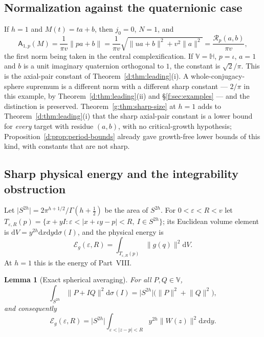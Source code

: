 \documentclass[11pt,a4paper]{article}
\numberwithin{equation}{section}
\newtheorem{lemma}[theorem]{Lemma}
\theoremstyle{definition}
\theoremstyle{remark}
\theoremstyle{plain}
\newcommand{\HH}{\mathbb H}
\newcommand{\Rp}{\mathcal R_{p}}      %
\newcommand{\Eg}{\mathcal E_{g}}
\newcommand{\Tube}{T}
\newcommand{\abs}[1]{\lvert #1\rvert}
\newcommand{\norm}[1]{\lVert #1\rVert}
\newcommand{\dd}{\mathrm d}
\newcommand{\VV}{\mathbb V}                       %
\begin{document}
\subsection{Normalization against the quaternionic case}
\label{g:sub:normalization}

If $h=1$ and $M(t)=ta+b$, then $j_0=0$, $N=1$, and
\[
 \mathsf A_{1,p}(M)=\frac1{\pi v}\norm{pa+b}
 =\frac1{\pi v}\sqrt{\norm{ua+b}^2+v^2\norm a^2}=\frac{\Rp(a,b)}{\pi v},
\]
the first norm being taken in the central complexification. If $\VV=\HH$,
$p=\iota$, $a=1$ and $b$ is a unit imaginary quaternion orthogonal to $1$, the
constant is $\sqrt2/\pi$. This is the axial-pair constant of
Theorem~\ref{d:thm:leading}(i). A whole-conjugacy-sphere supremum is a
different norm with a different sharp constant --- $2/\pi$ in this example,
by Theorem~\ref{d:thm:leading}(ii) and \S\ref{f:sec:examples} --- and the
distinction is preserved. Theorem~\ref{g:thm:sharp-size} at $h=1$ adds to
Theorem~\ref{d:thm:leading}(i) that the sharp axial-pair constant is a lower
bound for \emph{every} target with residue $(a,b)$, with no critical-growth
hypothesis; Proposition~\ref{d:prop:period-bounds} already gave growth-free
lower bounds of this kind, with constants that are not sharp.

\subsection{Sharp physical energy and the integrability obstruction}
\label{g:sub:energy}

Let $\abs{S^{2h}}=2\pi^{h+1/2}/\Gamma(h+\tfrac12)$ be the area of $S^{2h}$. For
$0<\varepsilon<R<v$ let
$\Tube_{\varepsilon,R}(p)=\{x+yI:\varepsilon<\abs{x+\iota y-p}<R,\ I\in S^{2h}\}$;
its Euclidean volume element is $\dd V=y^{2h}\dd x\dd y\dd\sigma(I)$, and the
physical energy is
\begin{equation}\label{g:eq:physical-energy}
 \Eg(\varepsilon,R)=\int_{\Tube_{\varepsilon,R}(p)}\norm{g(q)}^2\dd V .
\end{equation}
At $h=1$ this is the energy of Part~VIII.

\begin{lemma}[Exact spherical averaging]
\label{g:lem:spherical-average}
For all $P,Q\in\VV$,
\begin{equation}\label{g:eq:spherical-average}
 \int_{S^{2h}}\norm{P+IQ}^2\dd\sigma(I)=\abs{S^{2h}}\bigl(\norm P^2+\norm Q^2\bigr),
\end{equation}
and consequently
\begin{equation}\label{g:eq:pair-energy}
 \Eg(\varepsilon,R)=\abs{S^{2h}}\int_{\varepsilon<\abs{z-p}<R}y^{2h}
 \norm{W(z)}^2\dd x\dd y .
\end{equation}
\end{lemma}
\end{document}
